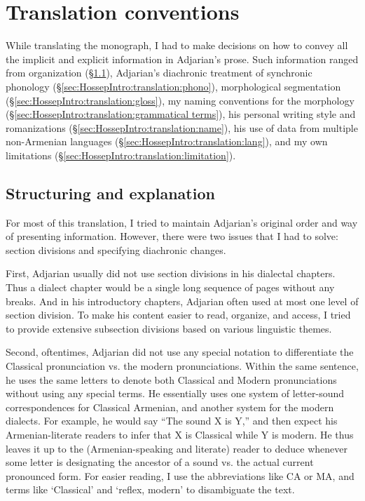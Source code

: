 \section{Translation conventions}\label{sec:HossepIntro:translation}
While translating the monograph, I had to make decisions on how to convey all the implicit and explicit information in Adjarian's prose. Such information ranged from organization (\S\ref{sec:HossepIntro:translation:exp}),  Adjarian's diachronic treatment of synchronic phonology  (\S\ref{sec:HossepIntro:translation:phono}),   morphological segmentation (\S\ref{sec:HossepIntro:translation:gloss}), my naming conventions for the morphology (\S\ref{sec:HossepIntro:translation:grammatical terms}),  his personal writing style and romanizations (\S\ref{sec:HossepIntro:translation:name}),  his use of data from multiple non-Armenian languages (\S\ref{sec:HossepIntro:translation:lang}), and my own limitations (\S\ref{sec:HossepIntro:translation:limitation}).
\subsection{Structuring and explanation}\label{sec:HossepIntro:translation:exp}
For most of this translation, I tried to maintain Adjarian's original order and way of presenting information. However, there were two issues that I had to solve: section divisions and specifying diachronic changes. 


First, Adjarian usually did not use section divisions in his dialectal chapters. Thus a dialect chapter would be a single long sequence of pages without any breaks. And in his introductory chapters, Adjarian often used at most one level of section division. To make his content easier to read, organize, and access, I tried to provide extensive subsection divisions based on various linguistic themes. 

Second,  oftentimes, Adjarian did not use any special notation to differentiate the Classical pronunciation vs. the modern pronunciations.  Within the same sentence, he uses the same letters to denote both Classical and Modern pronunciations without using any special terms.  He essentially uses one system of letter-sound correspondences for Classical Armenian, and another system for the modern dialects. For example, he would say  ``The sound X is Y,'' and then expect his Armenian-literate readers to  infer that X is Classical while Y is modern. He thus leaves it up to the (Armenian-speaking and literate) reader to deduce whenever some letter is designating the ancestor of a sound vs. the actual current pronounced form. For easier reading, I use the abbreviations like CA or MA, and terms like `Classical' and `reflex, modern' to disambiguate the text.   

